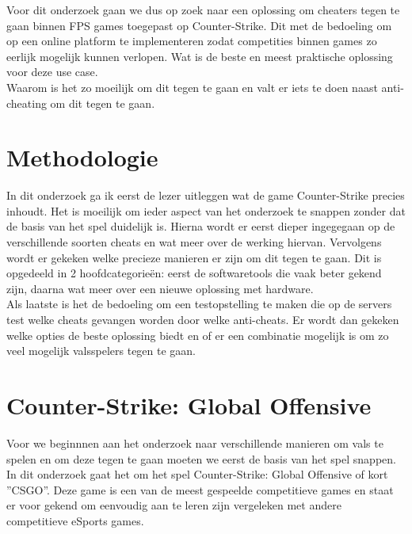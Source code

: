 \documentclass[pdftex,a4paper,12pt,twoside]{report}
\begin{document}
Voor dit onderzoek gaan we dus op zoek naar een oplossing om cheaters tegen te gaan binnen FPS games toegepast op Counter-Strike. Dit met de bedoeling om op een online platform te implementeren zodat competities binnen games zo eerlijk mogelijk kunnen verlopen. Wat is de beste en meest praktische oplossing voor deze use case. 
\\

Waarom is het zo moeilijk om dit tegen te gaan en valt er iets te doen naast anti-cheating om dit tegen te gaan.


\chapter{Methodologie}
\label{ch:methodologie}


In dit onderzoek ga ik eerst de lezer uitleggen wat de game Counter-Strike precies inhoudt. Het is moeilijk om ieder aspect van het onderzoek te snappen zonder dat de basis van het spel duidelijk is. Hierna wordt er eerst dieper ingegegaan op de verschillende soorten cheats en wat meer over de werking hiervan. Vervolgens wordt er gekeken welke precieze manieren er zijn om dit tegen te gaan. Dit is opgedeeld in 2 hoofdcategorieën: eerst de softwaretools die vaak beter gekend zijn, daarna wat meer over een nieuwe oplossing met hardware. 
\\

Als laatste is het de bedoeling om een testopstelling te maken die op de servers test welke cheats gevangen worden door welke anti-cheats. Er wordt dan gekeken welke opties de beste oplossing biedt en of er een combinatie mogelijk is om zo veel mogelijk valsspelers tegen te gaan. 


\chapter{Counter-Strike: Global Offensive}
\label{ch:csgo}
Voor we beginnnen aan het onderzoek naar verschillende manieren om vals te spelen en om deze tegen te gaan moeten we eerst de basis van het spel snappen. In dit onderzoek gaat het om het spel Counter-Strike: Global Offensive of kort ''CSGO''. Deze game is een van de meest gespeelde competitieve games en staat er voor gekend om eenvoudig aan te leren zijn vergeleken met andere competitieve eSports games. 
\\
\end{document}
